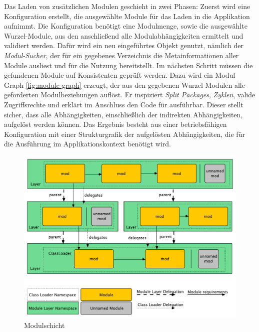      Das Laden von zusätzlichen Modulen geschieht in zwei Phasen: Zuerst wird eine Konfiguration erstellt, die ausgewählte Module für das Laden in die Applikation aufnimmt. Die Konfiguration benötigt eine Modulmenge, sowie die ausgewählte Wurzel-Module, aus den anschließend alle Modulabhängigkeiten ermittelt und validiert werden. Dafür wird ein neu eingeführtes Objekt genutzt, nämlich der \textit{Modul-Sucher}, der für ein gegebenes Verzeichnis die Metainformationen aller Module ausliest und für die Nutzung bereitstellt. \newline
     Im nächsten Schritt müssen die gefundenen Module auf Konsistenten geprüft werden. Dazu wird ein Modul Graph \ref{fig:module-graph} erzeugt, der aus den gegebenen Wurzel-Modulen alle geforderten Modulbeziehungen auflöst. Er inspiziert \textit{Split Packages}, \textit{Zyklen}, valide Zugriffsrechte und erklärt im Anschluss den Code für ausführbar. Dieser stellt sicher, dass alle Abhängigkeiten, einschließlich der indirekten Abhängigkeiten, aufgelöst werden können.\newline
     Das Ergebnis besteht aus einer betriebsfähigen Konfiguration mit einer Strukturgrafik der aufgelösten Abhängigkeiten, die für die Ausführung im Applikationskontext benötigt wird. \cite{java9modRevealed}\bigbreak 

    \begin{figure}[h!]
      \centering
      \includegraphics[width=\textwidth]{material/images/module-layer.pdf}
      \caption{Modulschicht \cite{javaMod9}}
      \label{fig:module-layer}
    \end{figure}

